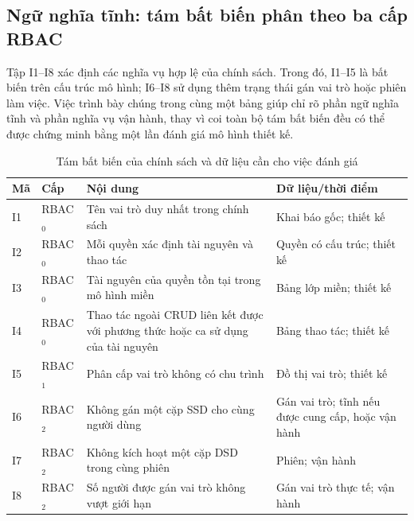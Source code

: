 \subsection{Ngữ nghĩa tĩnh: tám bất biến phân theo ba cấp RBAC}
\label{subsec:ngu-nghia-tinh}

Tập I1--I8 xác định các nghĩa vụ hợp lệ của chính sách. Trong đó, I1--I5 là bất biến trên cấu trúc mô hình; I6--I8 sử dụng thêm trạng thái gán vai trò hoặc phiên làm việc. Việc trình bày chúng trong cùng một bảng giúp chỉ rõ phần ngữ nghĩa tĩnh và phần nghĩa vụ vận hành, thay vì coi toàn bộ tám bất biến đều có thể được chứng minh bằng một lần đánh giá mô hình thiết kế.

\begin{table}[htbp]
\centering
\caption{Tám bất biến của chính sách và dữ liệu cần cho việc đánh giá}
\label{tab:bat-bien}
\small
\begin{tabularx}{\textwidth}{@{}llX>{\raggedright\arraybackslash}p{3cm}@{}}
\toprule
\textbf{Mã} & \textbf{Cấp} & \textbf{Nội dung} & \textbf{Dữ liệu/thời điểm} \\
\midrule
I1 & RBAC$_0$ & Tên vai trò duy nhất trong chính sách & Khai báo gốc; thiết kế \\
I2 & RBAC$_0$ & Mỗi quyền xác định tài nguyên và thao tác & Quyền có cấu trúc; thiết kế \\
I3 & RBAC$_0$ & Tài nguyên của quyền tồn tại trong mô hình miền & Bảng lớp miền; thiết kế \\
I4 & RBAC$_0$ & Thao tác ngoài CRUD liên kết được với phương thức hoặc ca sử dụng của tài nguyên & Bảng thao tác; thiết kế \\
I5 & RBAC$_1$ & Phân cấp vai trò không có chu trình & Đồ thị vai trò; thiết kế \\
I6 & RBAC$_2$ & Không gán một cặp SSD cho cùng người dùng & Gán vai trò; tĩnh nếu được cung cấp, hoặc vận hành \\
I7 & RBAC$_2$ & Không kích hoạt một cặp DSD trong cùng phiên & Phiên; vận hành \\
I8 & RBAC$_2$ & Số người được gán vai trò không vượt giới hạn & Gán vai trò thực tế; vận hành \\
\bottomrule
\end{tabularx}
\end{table}


